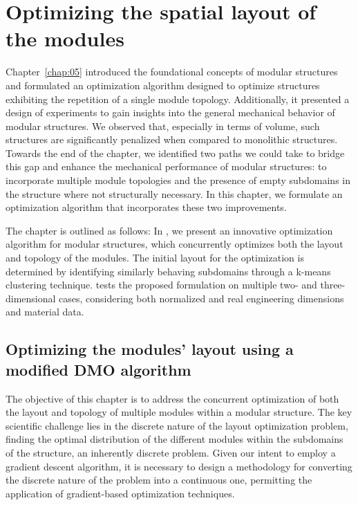 \setchapterpreamble[u]{\margintoc}
\glsresetall %
\chapter{Optimizing the spatial layout of the modules} \label{chap:06}
Chapter~\ref{chap:05} introduced the foundational concepts of modular structures and formulated an optimization algorithm designed to optimize structures exhibiting the repetition of a single module topology. Additionally, it presented a design of experiments to gain insights into the general mechanical behavior of modular structures. We observed that, especially in terms of volume, such structures are significantly penalized when compared to monolithic structures. Towards the end of the chapter, we identified two paths we could take to bridge this gap and enhance the mechanical performance of modular structures: to incorporate multiple module topologies and the presence of empty subdomains in the structure where not structurally necessary. In this chapter, we formulate an optimization algorithm that incorporates these two improvements.

The chapter is outlined as follows: In , we present an innovative optimization algorithm for modular structures, which concurrently optimizes both the layout and topology of the modules. The initial layout for the optimization is determined by identifying similarly behaving subdomains through a k-means clustering technique.  tests the proposed formulation on multiple two- and three-dimensional cases, considering both normalized and real engineering dimensions and material data.

\section{Optimizing the modules' layout using a modified DMO algorithm} \label{sec:06_opt}
The objective of this chapter is to address the concurrent optimization of both the layout and topology of multiple modules within a modular structure. The key scientific challenge lies in the discrete nature of the layout optimization problem, \ie finding the optimal distribution of the different modules within the subdomains of the structure, an inherently discrete problem. Given our intent to employ a gradient descent algorithm, it is necessary to design a methodology for converting the discrete nature of the problem into a continuous one, permitting the application of gradient-based optimization techniques.

